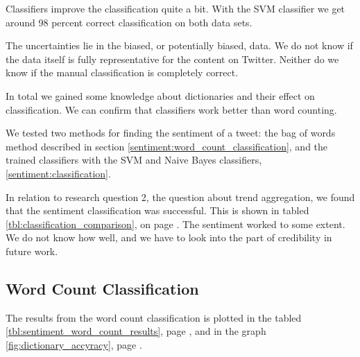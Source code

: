 Classifiers  improve the classification quite a bit. With the SVM classifier we
get around 98 percent correct classification on both data sets.

The uncertainties lie in the biased, or potentially biased, data. We do not
know if the data itself is fully representative for the content on Twitter.
Neither do we know if the manual classification is completely correct. 

In total we gained some knowledge about dictionaries and their effect on
classification. We can confirm that classifiers work better than word
counting.  

We tested two methods for finding the sentiment of a tweet: the bag of words
method described in section \ref{sentiment:word_count_classification}, and the
trained classifiers with the SVM and Naive Bayes classifiers,
\ref{sentiment:classification}.

In relation to research question 2, the question about trend
aggregation, we found that the sentiment classification was successful. This is
shown in tabled \ref{tbl:classification_comparison}, on page
\pageref{tbl:classification_comparison}. 
The sentiment worked to some extent. We do not
know how well, and we have to look into the part of credibility in future work.   
%

\subsection{Word Count Classification}\label{results:word_count_classification}
The results from the word count classification is plotted in the tabled
\ref{tbl:sentiment_word_count_results}, page
\pageref{tbl:sentiment_word_count_results}, and in the graph
\ref{fig:dictionary_accyracy}, page \pageref{fig:dictionary_accyracy}.

